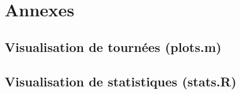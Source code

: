 \documentclass[10pt,a4paper]{article}
\begin{document}
\clearpage

\section{Annexes}

\subsection{Visualisation de tournées (plots.m)}



\subsection{Visualisation de statistiques (stats.R)}

\end{document}
